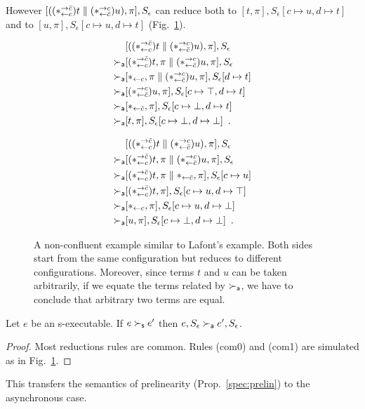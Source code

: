 \documentclass[envcountsame]{llncs}
\begin{document}
However $[((\ast^{\rightarrow {\bar{c}}}_{\leftarrow{c}})t\parallel (\ast^{\rightarrow {c}}_{\leftarrow{\bar{c}}})u),
\pi],S_\epsilon$
can reduce both to $[t,\pi], S_\epsilon[c\mapsto u, d\mapsto t]$
and to $[u,\pi], S_\epsilon[c\mapsto u,d\mapsto t]$ (Fig.~\ref{fig:lafont}).
\begin{figure}
 \begin{subfigure}[b]{0.45\textwidth}
  \begin{align*}
   & [((\ast^{\rightarrow {\bar{c}}}_{\leftarrow{c}})t\parallel (\ast^{\rightarrow {c}}_{\leftarrow{\bar{c}}}) u),\pi], S_\epsilon \\
   \succ_{\mathsf a} & [(\ast^{\rightarrow {\bar{c}}}_{\leftarrow{c}})t,\pi\parallel (\ast^{\rightarrow {c}}_{\leftarrow{\bar{c}}})u,\pi], S_\epsilon \\
   \succ_{\mathsf a} & [\ast_{\leftarrow{c}}, \pi\parallel (\ast^{\rightarrow {c}}_{\leftarrow{\bar{c}}})u,\pi], S_\epsilon[d\mapsto
   t] \\
   \succ_{\mathsf a} & [(\ast^{\rightarrow {c}}_{\leftarrow{\bar{c}}})u,\pi], S_\epsilon[c\mapsto \top, d\mapsto t] \\
   \succ_{\mathsf a} & [\ast_{\leftarrow{\bar{c}}}, \pi], S_\epsilon[c\mapsto \bot, d\mapsto t] \\
   \succ_{\mathsf a} & [t,\pi], S_\epsilon[c\mapsto \bot,d\mapsto \bot]\enspace.
  \end{align*}
 \end{subfigure}
 \begin{subfigure}[b]{0.45\textwidth}
  \begin{align*}
   & [((\ast^{\rightarrow {\bar{c}}}_{\leftarrow{c}})t\parallel (\ast^{\rightarrow {c}}_{\leftarrow{\bar{c}}}) u),\pi], S_\epsilon \\
   \succ_{\mathsf a} & [(\ast^{\rightarrow {\bar{c}}}_{\leftarrow{c}})t,\pi\parallel (\ast^{\rightarrow {c}}_{\leftarrow{\bar{c}}})u,\pi], S_\epsilon \\
   \succ_{\mathsf a} & [(\ast^{\rightarrow {\bar{c}}}_{\leftarrow{c}})t,\pi\parallel \ast_{\leftarrow{\bar{c}}},\pi], S_\epsilon[c\mapsto u] \\
   \succ_{\mathsf a} & [(\ast^{\rightarrow {\bar{c}}}_{\leftarrow{c}})t,\pi], S_\epsilon[c\mapsto u, d\mapsto \top] \\
   \succ_{\mathsf a} & [\ast_{\leftarrow{c}},\pi], S_\epsilon[c\mapsto u,d\mapsto \bot] \\
   \succ_{\mathsf a} & [u,\pi], S_\epsilon[c\mapsto \bot,d\mapsto \bot]\enspace.
  \end{align*}
 \end{subfigure}
 \caption[A non-confluent example similar to Lafont's example.]
 {A non-confluent example similar to Lafont's example.  Both sides start
 from the same configuration but reduces to different configurations.
 Moreover, since terms $t$ and $u$ can be taken arbitrarily, if we
 equate the terms related by $\succ_{\mathsf a}$, we have to conclude that arbitrary
 two terms are equal.}
 \label{fig:lafont}
\end{figure}

\begin{proposition}
 Let $e$ be an s-executable.
 If $e\succ_{\mathsf s} e'$ then $e, S_\epsilon \succ_{\mathsf a} e', S_\epsilon$.
\end{proposition}
\begin{proof}
 Most reductions rules are common.  Rules (com0) and (com1) are
 simulated as in Fig.~\ref{fig:lafont}.
\end{proof}
This transfers the semantics of prelinearity (Prop.~\ref{spec:prelin}) to the asynchronous case.
\end{document}
